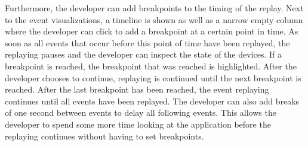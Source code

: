 Furthermore, the developer can add breakpoints to the timing of the replay. Next to the event visualizations, a timeline is shown as well as a narrow empty column where the developer can click to add a breakpoint at a certain point in time. As soon as all events that occur before this point of time have been replayed, the replaying pauses and the developer can inspect the state of the devices. If a breakpoint is reached, the breakpoint that was reached is highlighted. After the developer chooses to continue, replaying is continued until the next breakpoint is reached. After the last breakpoint has been reached, the event replaying continues until all events have been replayed. The developer can also add breaks of one second between events to delay all following events. This allows the developer to spend some more time looking at the application before the replaying continues without having to set breakpoints. 